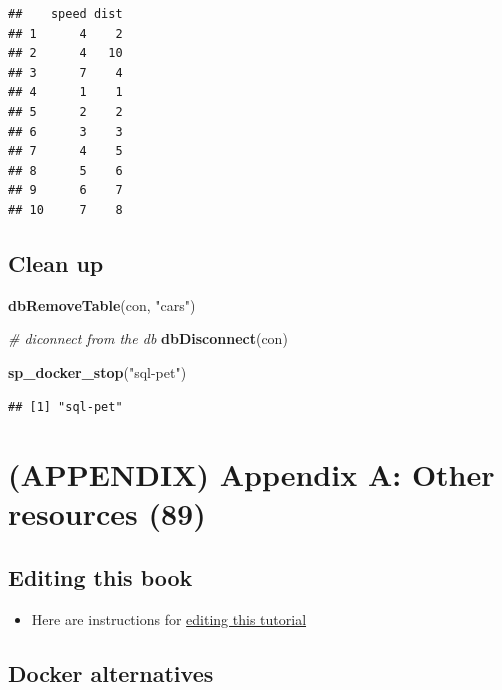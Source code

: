 \documentclass[]{book}
\newenvironment{Shaded}{\begin{snugshade}}{\end{snugshade}}
\newcommand{\CommentTok}[1]{\textcolor[rgb]{0.56,0.35,0.01}{\textit{#1}}}
\newcommand{\KeywordTok}[1]{\textcolor[rgb]{0.13,0.29,0.53}{\textbf{#1}}}
\newcommand{\NormalTok}[1]{#1}
\newcommand{\StringTok}[1]{\textcolor[rgb]{0.31,0.60,0.02}{#1}}
\providecommand{\tightlist}{%
  \setlength{\itemsep}{0pt}\setlength{\parskip}{0pt}}
\theoremstyle{definition}
\theoremstyle{definition}
\theoremstyle{definition}
\theoremstyle{remark}
\begin{document}
\begin{verbatim}
##    speed dist
## 1      4    2
## 2      4   10
## 3      7    4
## 4      1    1
## 5      2    2
## 6      3    3
## 7      4    5
## 8      5    6
## 9      6    7
## 10     7    8
\end{verbatim}

\hypertarget{clean-up-3}{%
\section{Clean up}\label{clean-up-3}}

\begin{Shaded}
\begin{Highlighting}[]
\KeywordTok{dbRemoveTable}\NormalTok{(con, }\StringTok{"cars"}\NormalTok{)}

\CommentTok{# diconnect from the db}
\KeywordTok{dbDisconnect}\NormalTok{(con)}

\KeywordTok{sp_docker_stop}\NormalTok{(}\StringTok{"sql-pet"}\NormalTok{)}
\end{Highlighting}
\end{Shaded}

\begin{verbatim}
## [1] "sql-pet"
\end{verbatim}

\hypertarget{appendix-appendix-a-other-resources-89}{%
\chapter{(APPENDIX) Appendix A: Other resources
(89)}\label{appendix-appendix-a-other-resources-89}}

\hypertarget{editing-this-book}{%
\section{Editing this book}\label{editing-this-book}}

\begin{itemize}
\tightlist
\item
  Here are instructions for
  \href{https://github.com/smithjd/sql-pet/blob/master/maintaining-the-bookdown-site.md}{editing
  this tutorial}
\end{itemize}

\hypertarget{docker-alternatives}{%
\section{Docker alternatives}\label{docker-alternatives}}
\end{document}

